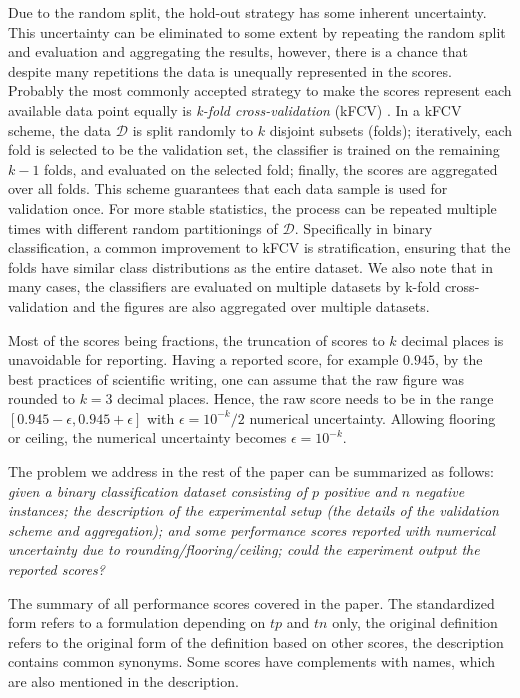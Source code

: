 \documentclass[5p, final]{elsarticle}
\begin{document}
Due to the random split, the hold-out strategy has some inherent uncertainty. This uncertainty can be eliminated to some extent by repeating the random split and evaluation and aggregating the results, however, there is a chance that despite many repetitions the data is unequally represented in the scores. Probably the most commonly accepted strategy to make the scores represent each available data point equally is \emph{k-fold cross-validation} (kFCV) \cite{cv1}. In a kFCV scheme, the data $\mathcal{D}$ is split randomly to $k$ disjoint subsets (folds); iteratively, each fold is selected to be the validation set, the classifier is trained on the remaining $k-1$ folds, and evaluated on the selected fold; finally, the scores are aggregated over all folds. This scheme guarantees that each data sample is used for validation once. For more stable statistics, the process can be repeated multiple times with different random partitionings of $\mathcal{D}$. Specifically in binary classification, a common improvement to kFCV is stratification, ensuring that the folds have similar class distributions as the entire dataset. We also note that in many cases, the classifiers are evaluated on multiple datasets by k-fold cross-validation and the figures are also aggregated over multiple datasets.

Most of the scores being fractions, the truncation of scores to $k$ decimal places is unavoidable for reporting. Having a reported score, for example $0.945$, by the best practices of scientific writing, one can assume that the raw figure was rounded to $k=3$ decimal places. Hence, the raw score needs to be in the range $[0.945 - \epsilon, 0.945 + \epsilon]$ with $\epsilon = 10^{-k}/2$ numerical uncertainty. Allowing flooring or ceiling, the numerical uncertainty becomes $\epsilon = 10^{-k}$.

The problem we address in the rest of the paper can be summarized as follows: \emph{given a binary classification dataset consisting of $p$ positive and $n$ negative instances; the description of the experimental setup (the details of the validation scheme and aggregation); and some performance scores reported with numerical uncertainty due to rounding/flooring/ceiling; could the experiment output the reported scores?}

\begin{table}
\caption{The summary of all performance scores covered in the paper. The standardized form refers to a formulation depending on $tp$ and $tn$ only, the original definition refers to the original form of the definition based on other scores, the description contains common synonyms. Some scores have complements with names, which are also mentioned in the description.}
\label{tab:scores}
\begin{scriptsize}
\begingroup
\renewcommand{\arraystretch}{3.0}

\endgroup
\end{scriptsize}
\end{table}
\end{document}
